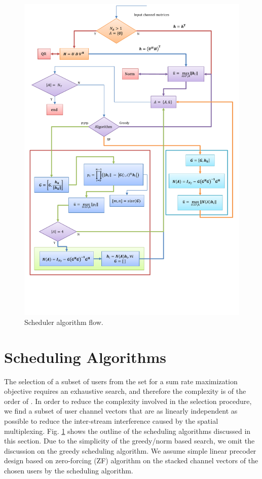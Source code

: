 \documentclass[conference,letterpaper]{./../../IEEE/IEEEtran}
\begin{document}
\begin{figure}
	\centering
	\includegraphics[trim=0in 1.5in 0in 0.75in,width=\columnwidth, angle=0]{Algorithm_Model}
	\caption{Scheduler algorithm flow.}
	\label{kuva:scheduler_block_diag}
	\vspace{-0.1in}
\end{figure}

\section{Scheduling Algorithms}
\label{sec:sched_discussions}
The selection of a subset of users  from the set  for a sum rate maximization objective requires an exhaustive search, and therefore the complexity is of the order of . In order to reduce the complexity involved in the selection procedure, we find a subset of user channel vectors that are as linearly independent as possible to reduce the inter-stream interference caused by the spatial multiplexing. Fig. \ref{kuva:scheduler_block_diag} shows the outline of the scheduling algorithms discussed in this section. Due to the simplicity of the greedy/norm based search, we omit the discussion on the greedy scheduling algorithm. We assume simple linear precoder design based on zero-forcing (ZF) algorithm on the stacked channel vectors of the chosen users by the scheduling algorithm.
\end{document}
